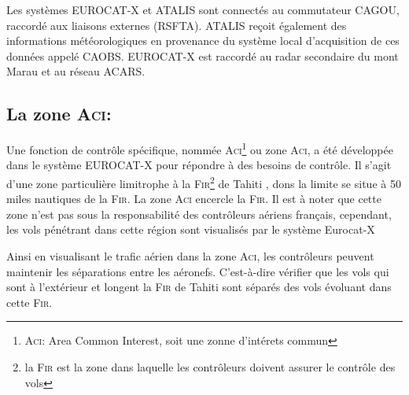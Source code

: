 Les systèmes EUROCAT-X et ATALIS sont connectés au commutateur CAGOU, raccordé aux liaisons externes (RSFTA). ATALIS reçoit également des informations météorologiques en provenance du système local d’acquisition de ces données appelé CAOBS. EUROCAT-X est raccordé au radar secondaire du mont Marau et au réseau ACARS.

    \subsection{La zone \textsc{Aci}:\label{Aci}}
Une fonction de contrôle spécifique, nommée \textsc{Aci}\footnote{\textsc{Aci}: Area Common Interest, soit une zonne d'intérets commun} ou zone \textsc{Aci}, a été développée dans le système EUROCAT-X pour répondre à des besoins de contrôle. Il s’agit d’une zone particulière limitrophe à la \textsc{Fir}\footnote{\label{FIR} la \textsc{Fir} est la zone dans laquelle les contrôleurs doivent assurer le contrôle des vols} de Tahiti , dons la limite se situe à 50 miles nautiques de la \textsc{Fir}. La zone \textsc{Aci} encercle la \textsc{Fir}. Il est à noter que cette zone n’est pas sous la responsabilité des contrôleurs aériens français, cependant, les vols pénétrant dans cette région sont visualisés par le système Eurocat-X 

Ainsi en visualisant le trafic aérien dans la zone \textsc{Aci}, les contrôleurs peuvent maintenir les séparations entre les aéronefs. C'est-à-dire vérifier que les vols qui sont à l’extérieur et longent la \textsc{Fir} de Tahiti sont séparés des vols évoluant dans cette \textsc{Fir}.
